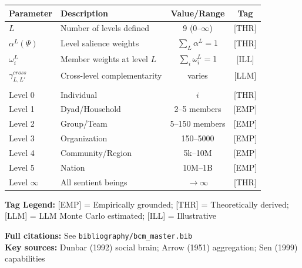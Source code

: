 \begin{tcolorbox}[colback=blue!5!white, colframe=blue!75!black,
    title=\textbf{Epistemic Status: Key Parameters}]

\renewcommand{\arraystretch}{1.3}
\begin{tabular}{@{}llcc@{}}
\toprule
\textbf{Parameter} & \textbf{Description} & \textbf{Value/Range} & \textbf{Tag} \\
\midrule
$L$ & Number of levels defined & 9 (0--$\infty$) & [THR] \\
$\alpha^L(\Psi)$ & Level salience weights & $\sum_L \alpha^L = 1$ & [THR] \\
$\omega^L_i$ & Member weights at level $L$ & $\sum_i \omega^L_i = 1$ & [ILL] \\
$\gamma^{cross}_{L,L'}$ & Cross-level complementarity & varies & [LLM] \\
\addlinespace
\multicolumn{4}{@{}l}{\textit{Level definitions:}} \\
Level 0 & Individual & $i$ & [THR] \\
Level 1 & Dyad/Household & 2--5 members & [EMP] \\
Level 2 & Group/Team & 5--150 members & [EMP] \\
Level 3 & Organization & 150--5000 & [EMP] \\
Level 4 & Community/Region & 5k--10M & [EMP] \\
Level 5 & Nation & 10M--1B & [EMP] \\
Level $\infty$ & All sentient beings & $\rightarrow \infty$ & [THR] \\
\bottomrule
\end{tabular}

\vspace{0.5em}
\textbf{Tag Legend:} [EMP] = Empirically grounded; [THR] = Theoretically derived;
[LLM] = LLM Monte Carlo estimated; [ILL] = Illustrative

\end{tcolorbox}

\noindent\textbf{Full citations:} See \texttt{bibliography/bcm\_master.bib} \\
\textbf{Key sources:} Dunbar (1992) social brain; Arrow (1951) aggregation; Sen (1999) capabilities

\vspace{1em}


